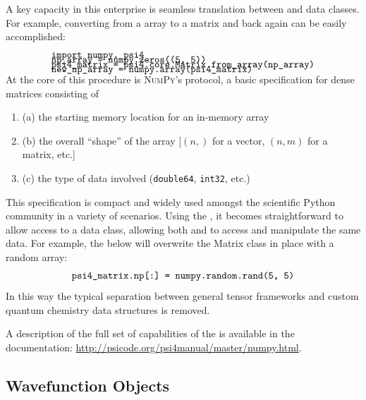 A key capacity in this enterprise is seamless translation between \numpy and \pfour data classes. For example, converting from a \numpy array to a \pfour matrix and back again can be easily accomplished:
\begin{eqnarray}
  \begin{aligned}
    &\verb!import numpy, psi4! \\[-10pt]
    &\verb!np_array = numpy.zeros((5, 5))! \\[-10pt]
    &\verb!psi4_matrix = psi4.core.Matrix.from_array(np_array)! \\[-10pt]
    &\verb!new_np_array = numpy.array(psi4_matrix)! \\[-10pt]
  \end{aligned}
  \label{snip:np2p42np}
\end{eqnarray}
At the core of this procedure is \textsc{NumPy}'s \arrayint \cite{array_interface} protocol, a basic specification for dense matrices consisting of
\begin{enumerate}
\item (a) the starting memory location for an in-memory array
\item (b) the overall ``shape'' of the array [$(n,)$ for a vector, $(n,m)$ for a matrix, etc.]
\item (c) the type of data involved (\texttt{double64}, \texttt{int32}, etc.)
\end{enumerate}
This specification is compact and widely used amongst the scientific Python community in a variety of scenarios. Using the \arrayint, it becomes straightforward to allow \numpy access to a \pfour data class, allowing both \pfour and \numpy to access and manipulate the same data. For example, the below will overwrite the \pfour Matrix class in place with a random \numpy array:
\begin{eqnarray}
  \begin{aligned}
    &\verb!psi4_matrix.np[:] = numpy.random.rand(5, 5)! \\
  \end{aligned}
  \label{snip:numpy_set}
\end{eqnarray}
In this way the typical separation between general tensor frameworks and custom quantum chemistry data structures is removed.

A description of the full set of capabilities of the \arrayint is available in the \pfour documentation: \url{http://psicode.org/psi4manual/master/numpy.html}.

\subsection{Wavefunction Objects}

